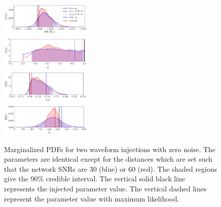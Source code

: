 \documentclass[prd,aps,letter,twocolumn,floatfix,notitlepage,nofootinbib]{revtex4-1}
\begin{document}
\begin{figure}[htb]
\centering
\includegraphics[width=0.39\textwidth]{chirpmass.pdf}\\
\includegraphics[width=0.39\textwidth]{q.pdf}\\
\includegraphics[width=0.39\textwidth]{chieff.pdf}\\
\includegraphics[width=0.39\textwidth]{tildelambda.pdf}
\caption{Marginalized PDFs for two waveform injections with zero noise. The parameters are identical except for the distances which are set such that the network SNRs are 30 (blue) or 60 (red). The shaded regions give the 90\% credible interval. The vertical solid black line represents the injected parameter value. The vertical dashed lines represent the parameter value with maximum likelihood.}
\label{fig:pe}
\end{figure}

\end{document}
